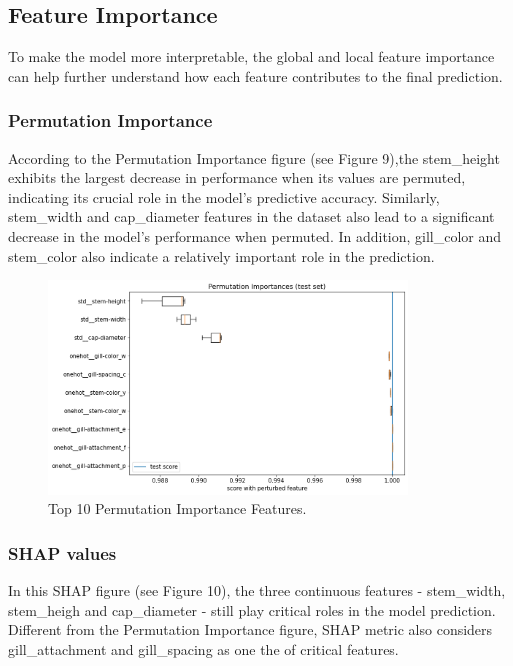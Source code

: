 \documentclass{article}
\begin{document}
\subsection{Feature Importance}
\hspace{0.5cm} To make the model more interpretable, the global and local feature importance can help further understand how each feature contributes to the final prediction.

\subsubsection{Permutation Importance}
\hspace{0.5cm} According to the Permutation Importance figure (see Figure 9),the stem\_height exhibits the largest decrease in performance when its values are permuted, indicating its crucial role in the model's predictive accuracy. Similarly, stem\_width and cap\_diameter features in the dataset also lead to a significant decrease in the model's performance when permuted. In addition, gill\_color and stem\_color also indicate a relatively important role in the prediction.

\begin{figure}[h]
\centering
\includegraphics[width=0.85\textwidth]{permutation_knn.png}
\caption{\label{fig:frog} Top 10 Permutation Importance Features.}
\end{figure}

\subsubsection{SHAP values}
\hspace{0.5cm} In this SHAP figure (see Figure 10), the three continuous features - stem\_width, stem\_heigh and cap\_diameter - still play critical roles in the model prediction. Different from the Permutation Importance figure, SHAP metric also considers gill\_attachment and gill\_spacing as one the of critical features.
\end{document}
